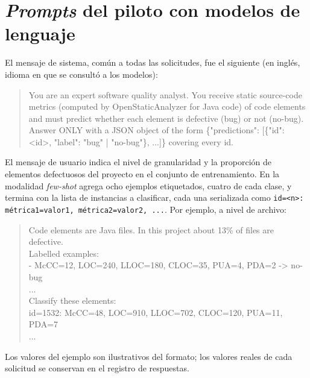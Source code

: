 \section{\textit{Prompts} del piloto con modelos de lenguaje}

El mensaje de sistema, común a todas las solicitudes, fue el siguiente (en inglés, idioma en que se consultó a los modelos):

\begin{quote}
\small\ttfamily
You are an expert software quality analyst. You receive static source-code metrics (computed by OpenStaticAnalyzer for Java code) of code elements and must predict whether each element is defective (bug) or not (no-bug). Answer ONLY with a JSON object of the form \{"predictions": [\{"id": <id>, "label": "bug" | "no-bug"\}, ...]\} covering every id.
\end{quote}

El mensaje de usuario indica el nivel de granularidad y la proporción de elementos defectuosos del proyecto en el conjunto de entrenamiento. En la modalidad \textit{few-shot} agrega ocho ejemplos etiquetados, cuatro de cada clase, y termina con la lista de instancias a clasificar, cada una serializada como \texttt{id=<n>: métrica1=valor1, métrica2=valor2, ...}. Por ejemplo, a nivel de archivo:

\begin{quote}
\small\ttfamily
Code elements are Java files. In this project about 13\% of files are defective.\\
Labelled examples:\\
- McCC=12, LOC=240, LLOC=180, CLOC=35, PUA=4, PDA=2 -> no-bug\\
...\\
Classify these elements:\\
id=1532: McCC=48, LOC=910, LLOC=702, CLOC=120, PUA=11, PDA=7\\
...
\end{quote}

Los valores del ejemplo son ilustrativos del formato; los valores reales de cada solicitud se conservan en el registro de respuestas.
